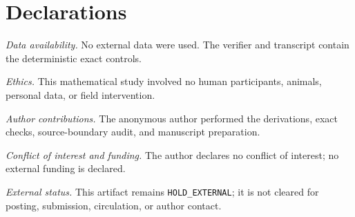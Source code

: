 \documentclass[a4paper,10pt]{amsart}
\theoremstyle{remark}
\begin{document}
\section*{Declarations}
\noindent\textit{Data availability.}
No external data were used.  The verifier and transcript contain the
deterministic exact controls.

\smallskip\noindent\textit{Ethics.}
This mathematical study involved no human participants, animals, personal
data, or field intervention.

\smallskip\noindent\textit{Author contributions.}
The anonymous author performed the derivations, exact checks, source-boundary
audit, and manuscript preparation.

\smallskip\noindent\textit{Conflict of interest and funding.}
The author declares no conflict of interest; no external funding is declared.

\smallskip\noindent\textit{External status.}
This artifact remains \texttt{HOLD\_EXTERNAL}; it is not cleared for posting,
submission, circulation, or author contact.



\end{document}
